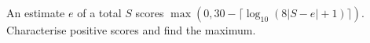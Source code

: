 An estimate $e$ of a total $S$ scores $\max(0,30-\lceil\log_{10}(8|S-e|+1)\rceil)$. Characterise positive scores and find the maximum.
